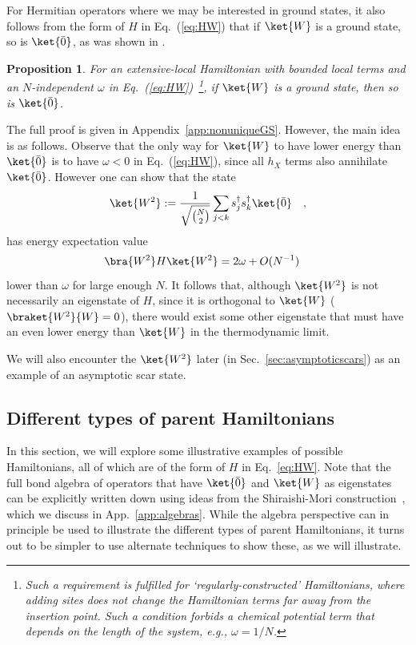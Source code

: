 \documentclass[prx,letterpaper,aps,superscriptaddress,floatfix,twocolumn,nofootinbib]{revtex4-2}
\newtheorem{prop}{Proposition}
\theoremstyle{definition}
\newcommand{\defn}{:=}
\begin{document}
%
For Hermitian operators where we may be interested in ground states, it also follows from the form of $H$ in Eq.~(\ref{eq:HW}) that if $\ket{W}$ is a ground state, so is $\ket{\bar{0}}$, as was shown in \cite{gioia2024wstateuniqueground}.
\begin{prop}
\label{prop:Wgroundstate}
    For an extensive-local Hamiltonian with bounded local terms and an $N$-independent $\omega$ in Eq.~(\ref{eq:HW})~\footnote{Such a requirement is fulfilled for `regularly-constructed' Hamiltonians, where adding sites does not change the Hamiltonian terms far away from the insertion point.
    Such a condition forbids a chemical potential term that depends on the length of the system, e.g., $\omega = 1/N$.}, if $\ket{W}$ is a ground state, then so is $\ket{\bar{0}}$.
\end{prop}
%
The full proof is given in Appendix~\ref{app:nonuniqueGS}.
However, the main idea is as follows.
Observe that the only way for $\ket{W}$ to have lower energy than $\ket{\bar{0}}$ is to have $\omega < 0$ in Eq.~(\ref{eq:HW}), since all $h_X$ terms also annihilate $\ket{\bar{0}}$.
However one can show that the state
\begin{equation}
    \ket{W^2} \defn \frac{1}{\sqrt{\binom{N}{2}}} \sum_{j < k} s_j^\dagger s_k^\dagger \ket{\bar{0}}\quad,
    \label{eq:W2}
\end{equation}
has energy expectation value
\begin{equation}
    \bra{W^2}H\ket{W^2}=2\omega+O(N^{-1})\quad
    \label{eq:W2energy}
\end{equation}
lower than $\omega$ for large enough $N$.
It follows that, although $\ket{W^2}$ is not necessarily an eigenstate of $H$, since it is orthogonal to $\ket{W}$ ($\braket{W^2}{W} = 0$), there would exist some other eigenstate that must have an even lower energy than $\ket{W}$ in the thermodynamic limit.
    
We will also encounter the $\ket{W^2}$ later (in Sec.~\ref{sec:asymptoticscars}) as an example of an asymptotic scar state.
%

%
\subsection{Different types of parent Hamiltonians}
\label{subsec:Wdifferenttypes}
%
In this section, we will explore some illustrative examples of possible Hamiltonians, all of which are of the form of $H$ in Eq.~\eqref{eq:HW}.
%
Note that the full bond algebra of operators that have $\ket{\bar{0}}$ and $\ket{W}$ as eigenstates can be explicitly written down using ideas from the Shiraishi-Mori construction~\cite{Shiraishi_2017,  moudgalya2023exhaustive}, which we discuss in App.~\ref{app:algebras}.  
%
While the algebra perspective can in principle be used to illustrate the different types of parent Hamiltonians,  it turns out to be simpler to use alternate techniques to show these,  as we will illustrate. 
%
\end{document}
